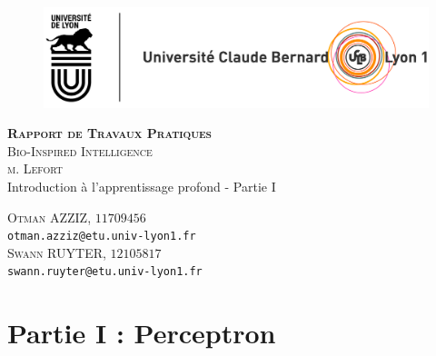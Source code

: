 \documentclass[a4paper]{article}
\begin{document}
	\begin{titlepage}
		\thispagestyle{empty}
		\begin{figure}[h]
			\centering
			\includegraphics[width=.85\linewidth]{logo.jpg}
		\end{figure}
		
		\vspace*{\fill}
		
		\begin{center}
			\textbf{\textsc{\LARGE Rapport de Travaux Pratiques}}\\
			\vspace*{1cm}
			\vspace*{1cm}
			\textsc{\Large Bio-Inspired Intelligence}\\
			\Large \textsc{m}. \textsc{Lefort}\\
			\vspace*{.5cm}
			\vspace*{.5cm}
			\Large Introduction à l'apprentissage profond - Partie I
		\end{center}
		
		\vspace*{\fill}
		
		\begin{center}
			\textsc{\large Otman AZZIZ, $11709456$}\\
			\texttt{otman.azziz@etu.univ-lyon1.fr}\\[1em]
			\textsc{\large Swann RUYTER, $12105817$}\\
			\texttt{swann.ruyter@etu.univ-lyon1.fr}\\
		\end{center}
	\end{titlepage}
	
	\pagestyle{fancy}
	\renewcommand{\headrulewidth}{0pt}
	\renewcommand{\footrulewidth}{1pt}
	\fancyhf{}
	\fancyfoot[C]{\thepage}
	
	\setcounter{section}{1} 
	\section*{Partie I : Perceptron}
		
\end{document}
